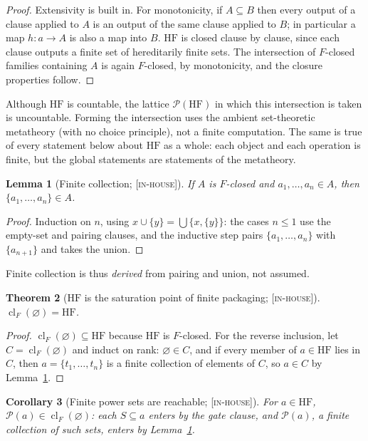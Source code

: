\documentclass[11pt]{article}
\newcommand{\HF}{\mathrm{HF}}                 \newcommand{\rank}{\operatorname{rank}}
\newcommand{\powset}{\mathcal{P}}
\newcommand{\clF}{\operatorname{cl}_F}
\newcommand{\gradetag}[1]{\textnormal{\textsc{[#1]}}}
\newcommand{\inhouse}{\gradetag{in-house}}
\newtheorem{theorem}{Theorem}[section]
\newtheorem{lemma}[theorem]{Lemma}
\newtheorem{corollary}[theorem]{Corollary}
\theoremstyle{definition}
\begin{document}
\begin{proof}
Extensivity is built in. For monotonicity, if $A\subseteq B$ then every output of a clause applied
to $A$ is an output of the same clause applied to $B$; in particular a map $h\colon a\to A$ is
also a map into $B$. $\HF$ is closed clause by clause, since each clause outputs a finite set of
hereditarily finite sets. The intersection of $F$-closed families containing $A$ is again
$F$-closed, by monotonicity, and the closure properties follow.
\end{proof}

\noindent Although $\HF$ is countable, the lattice $\powset(\HF)$ in which this intersection is
taken is uncountable. Forming the intersection uses the ambient set-theoretic metatheory (with no
choice principle), not a finite computation. The same is true of every statement below about
$\HF$ as a whole: each object and each operation is finite, but the global statements are
statements of the metatheory.

\begin{lemma}[Finite collection; \inhouse]\label{lem:collection}
If $A$ is $F$-closed and $a_1,\dots,a_n\in A$, then $\{a_1,\dots,a_n\}\in A$.
\end{lemma}

\begin{proof}
Induction on $n$, using $x\cup\{y\}=\bigcup\{x,\{y\}\}$: the cases $n\le 1$ use the empty-set
and pairing clauses, and the inductive step pairs $\{a_1,\dots,a_n\}$ with $\{a_{n+1}\}$ and takes
the union.
\end{proof}

\noindent Finite collection is thus \emph{derived} from pairing and union, not assumed.

\begin{theorem}[$\HF$ is the saturation point of finite packaging; \inhouse]\label{thm:hfclosure}
$\clF(\varnothing)=\HF$.
\end{theorem}

\begin{proof}
$\clF(\varnothing)\subseteq\HF$ because $\HF$ is $F$-closed. For the reverse inclusion, let
$C=\clF(\varnothing)$ and induct on rank: $\varnothing\in C$, and if every member of $a\in\HF$ lies
in $C$, then $a=\{t_1,\dots,t_n\}$ is a finite collection of elements of $C$, so $a\in C$ by
Lemma~\ref{lem:collection}.
\end{proof}

\begin{corollary}[Finite power sets are reachable; \inhouse]\label{cor:finpow}
For $a\in\HF$, $\powset(a)\in\clF(\varnothing)$: each $S\subseteq a$ enters by the gate clause,
and $\powset(a)$, a finite collection of such sets, enters by Lemma~\ref{lem:collection}.
\end{corollary}
\end{document}

